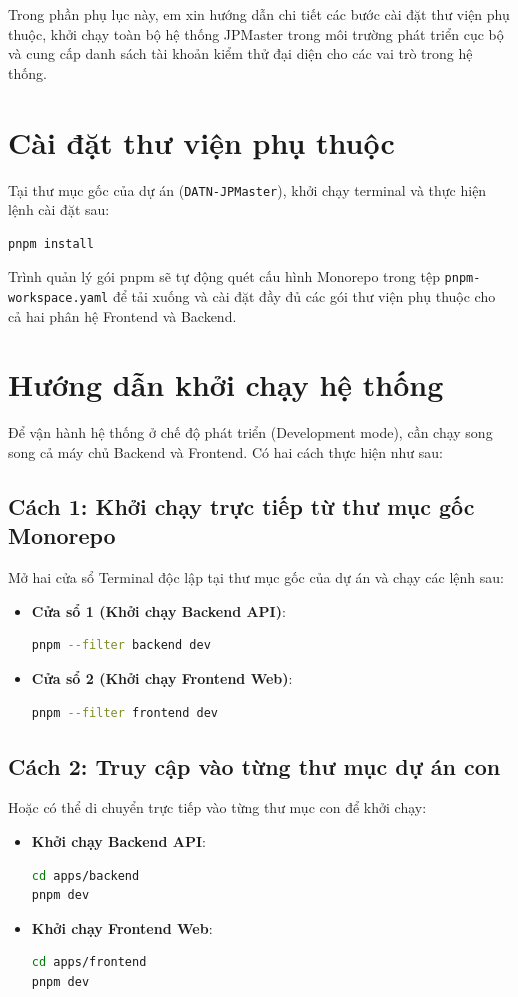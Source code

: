 \documentclass[../DoAn.tex]{subfiles}
\begin{document}
Trong phần phụ lục này, em xin hướng dẫn chi tiết các bước cài đặt thư viện phụ thuộc, khởi chạy toàn bộ hệ thống JPMaster trong môi trường phát triển cục bộ và cung cấp danh sách tài khoản kiểm thử đại diện cho các vai trò trong hệ thống.

\section{Cài đặt thư viện phụ thuộc}
Tại thư mục gốc của dự án (\texttt{DATN-JPMaster}), khởi chạy terminal và thực hiện lệnh cài đặt sau:
\begin{lstlisting}[language=bash]
pnpm install
\end{lstlisting}
Trình quản lý gói pnpm sẽ tự động quét cấu hình Monorepo trong tệp \texttt{pnpm-workspace.yaml} để tải xuống và cài đặt đầy đủ các gói thư viện phụ thuộc cho cả hai phân hệ Frontend và Backend.

\section{Hướng dẫn khởi chạy hệ thống}
Để vận hành hệ thống ở chế độ phát triển (Development mode), cần chạy song song cả máy chủ Backend và Frontend. Có hai cách thực hiện như sau:

\subsection{Cách 1: Khởi chạy trực tiếp từ thư mục gốc Monorepo}
Mở hai cửa sổ Terminal độc lập tại thư mục gốc của dự án và chạy các lệnh sau:
\begin{itemize}
    \item \textbf{Cửa sổ 1 (Khởi chạy Backend API)}:
    \begin{lstlisting}[language=bash]
pnpm --filter backend dev
    \end{lstlisting}
    \item \textbf{Cửa sổ 2 (Khởi chạy Frontend Web)}:
    \begin{lstlisting}[language=bash]
pnpm --filter frontend dev
    \end{lstlisting}
\end{itemize}

\subsection{Cách 2: Truy cập vào từng thư mục dự án con}
Hoặc có thể di chuyển trực tiếp vào từng thư mục con để khởi chạy:
\begin{itemize}
    \item \textbf{Khởi chạy Backend API}:
    \begin{lstlisting}[language=bash]
cd apps/backend
pnpm dev
    \end{lstlisting}
    \item \textbf{Khởi chạy Frontend Web}:
    \begin{lstlisting}[language=bash]
cd apps/frontend
pnpm dev
    \end{lstlisting}
\end{itemize}
\end{document}
